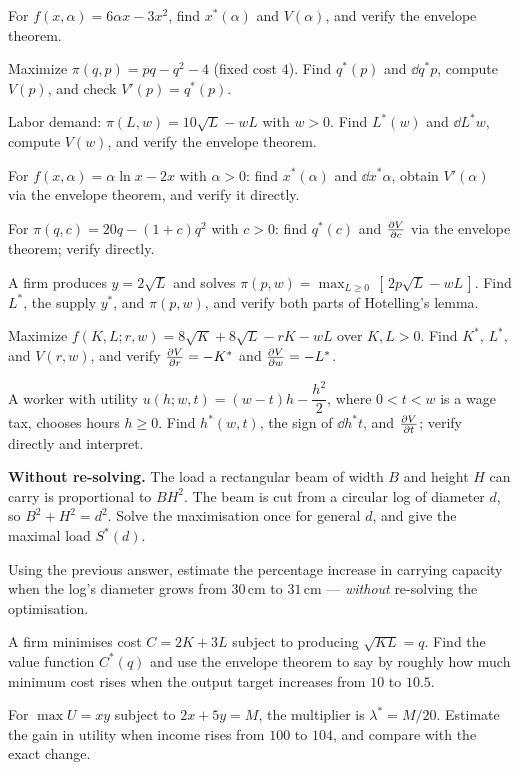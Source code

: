 \begin{problems}
  \item For $f(x,\alpha)=6\alpha x-3x^2$, find $x^*(\alpha)$ and
        $V(\alpha)$, and verify the envelope theorem.
  \item Maximize $\pi(q,p)=pq-q^2-4$ (fixed cost $4$). Find $q^*(p)$
        and $\dd{q^*}{p}$, compute $V(p)$, and check $V'(p)=q^*(p)$.
  \item Labor demand: $\pi(L,w)=10\sqrt{L}-wL$ with $w>0$. Find
        $L^*(w)$ and $\dd{L^*}{w}$, compute $V(w)$, and verify the
        envelope theorem.
  \item For $f(x,\alpha)=\alpha\ln x-2x$ with $\alpha>0$: find
        $x^*(\alpha)$ and $\dd{x^*}{\alpha}$, obtain $V'(\alpha)$ via
        the envelope theorem, and verify it directly.
  \item For $\pi(q,c)=20q-(1+c)q^2$ with $c>0$: find $q^*(c)$ and
        $\frac{\partial V}{\partial c}$ via the envelope theorem; verify directly.
  \item A firm produces $y=2\sqrt{L}$ and solves
        $\pi(p,w)=\max_{L\ge0}\,[\,2p\sqrt{L}-wL\,]$. Find $L^*$, the
        supply $y^*$, and $\pi(p,w)$, and verify both parts of
        Hotelling's lemma.
  \item Maximize $f(K,L;r,w)=8\sqrt{K}+8\sqrt{L}-rK-wL$ over
        $K,L>0$. Find $K^*$, $L^*$, and $V(r,w)$, and verify
        $\frac{\partial V}{\partial r}=-K^*$ and $\frac{\partial V}{\partial w}=-L^*$.
  \item A worker with utility $u(h;w,t)=(w-t)h-\dfrac{h^2}{2}$, where
        $0<t<w$ is a wage tax, chooses hours $h\ge0$. Find $h^*(w,t)$,
        the sign of $\dd{h^*}{t}$, and $\frac{\partial V}{\partial t}$; verify directly and
        interpret.

  \item \textbf{Without re-solving.} The load a rectangular beam of width
        $B$ and height $H$ can carry is proportional to $BH^{2}$. The beam
        is cut from a circular log of diameter $d$, so $B^{2}+H^{2}=d^{2}$.
        Solve the maximisation once for general $d$, and give the maximal
        load $S^{*}(d)$.
  \item Using the previous answer, estimate the percentage increase in
        carrying capacity when the log's diameter grows from $30$\,cm to
        $31$\,cm --- \emph{without} re-solving the optimisation.
  \item A firm minimises cost $C=2K+3L$ subject to producing
        $\sqrt{KL}=q$. Find the value function $C^{*}(q)$ and use the
        envelope theorem to say by roughly how much minimum cost rises when
        the output target increases from $10$ to $10.5$.
  \item For $\max U=xy$ subject to $2x+5y=M$, the multiplier is
        $\lambda^{*}=M/20$. Estimate the gain in utility when income rises
        from $100$ to $104$, and compare with the exact change.


\end{problems}

